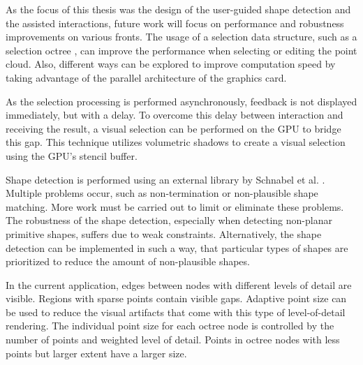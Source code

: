 As the focus of this thesis was the design of the user-guided shape detection and the assisted interactions, future work will focus on performance and robustness improvements on various fronts. The usage of a selection data structure, such as a selection octree \cite{scheiblauer2011out}, can improve the performance when selecting or editing the point cloud. Also, different ways can be explored to improve computation speed by taking advantage of the parallel architecture of the graphics card. 

\par

As the selection processing is performed asynchronously, feedback is not displayed immediately, but with a delay. To overcome this delay between interaction and receiving the result, a visual selection can be performed on the GPU \cite{rainer2016visual} to bridge this gap. This technique utilizes volumetric shadows to create a visual selection using the GPU's stencil buffer. 

\par

Shape detection is performed using an external library by Schnabel et al. \cite{schnabel-2007-software}. Multiple problems occur, such as non-termination or non-plausible shape matching. More work must be carried out to limit or eliminate these problems. The robustness of the shape detection, especially when detecting non-planar primitive shapes, suffers due to weak constraints. Alternatively, the shape detection can be implemented in such a way, that particular types of shapes are prioritized to reduce the amount of non-plausible shapes. 

\par

In the current application, edges between nodes with different levels of detail are visible. Regions with sparse points contain visible gaps. Adaptive point size \cite{scheiblauer-thesis} can be used to reduce the visual artifacts that come with this type of level-of-detail rendering. The individual point size for each octree node is controlled by the number of points and weighted level of detail. Points in octree nodes with less points but larger extent have a larger size. 
